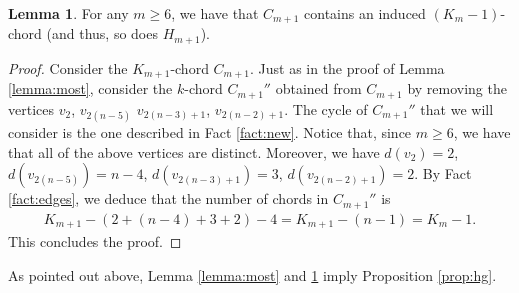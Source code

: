 \documentclass[12pt]{article}
\theoremstyle{definition}
\newtheorem{lemma}[thm]{Lemma}
\begin{document}
    \begin{lemma} \label{lemma:remainder}
        For any $m \geq 6$, we have that $C_{m+1}$ contains
        an induced $\left(K_{m} - 1\right)$-chord
        (and thus, so does $H_{m+1}$).
    \end{lemma}
    \begin{proof}
        Consider the $K_{m+1}$-chord $C_{m+1}$.
        Just as in the proof of Lemma \ref{lemma:most},
        consider the $k$-chord $C_{m+1}''$ obtained
        from $C_{m+1}$ by removing the vertices
        $v_2$, $v_{2\left(n-5\right)}$
        $v_{2\left(n-3\right)+1}$, $v_{2\left(n-2\right)+1}$.
        The cycle of $C_{m+1}''$ that
        we will consider is the one
        described in Fact \ref{fact:new}.
        Notice that, since $m \geq 6$, we have
        that all of the above vertices
        are distinct. Moreover, we have
        $d\left(v_2\right) = 2$, 
        $d\left(v_{2\left(n-5\right)}\right) = n-4$,
        $d\left(v_{2\left(n-3\right)+1}\right)=3$,
        $d\left(v_{2\left(n-2\right)+1}\right) = 2$.
        By Fact \ref{fact:edges}, 
        we deduce that the number of chords
        in $C_{m+1}''$ is
        \begin{gather*}
            K_{m+1} - \left(2 + \left(n-4\right)
            + 3 + 2\right) - 4 =
            K_{m+1} - \left(n-1\right) = K_{m} -1.
        \end{gather*}
        This concludes the proof.
    \end{proof}

    As pointed out above, Lemma
    \ref{lemma:most} and \ref{lemma:remainder}
    imply Proposition \ref{prop:hg}.
\end{document}
